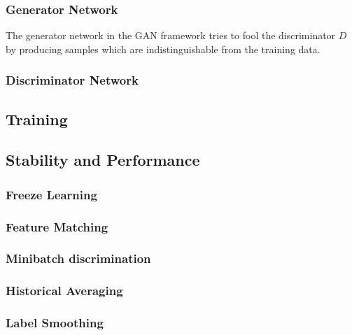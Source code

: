 \documentclass[twoside,11pt,a4paper]{article}
\theoremstyle{break}
\begin{document}
\subsubsection{Generator Network}
The generator network in the GAN framework tries to fool the discriminator $D$ by producing samples which are indistinguishable from the training data.


\subsubsection{Discriminator Network}


\subsection{Training}
\label{sub:gan_training}

\subsection{Stability and Performance}
\label{sub:gan_stability}

\subsubsection{Freeze Learning}
\label{ssub:gan_freeze_learning}

\subsubsection{Feature Matching}
\label{ssub:gan_feature_matching}

\subsubsection{Minibatch discrimination}
\label{ssub:gan_minibatch_discrimination}

\subsubsection{Historical Averaging}
\label{ssub:gan_historical_averaging}


\subsubsection{Label Smoothing}
\label{ssub:gan_label_smoothing}
\end{document}

